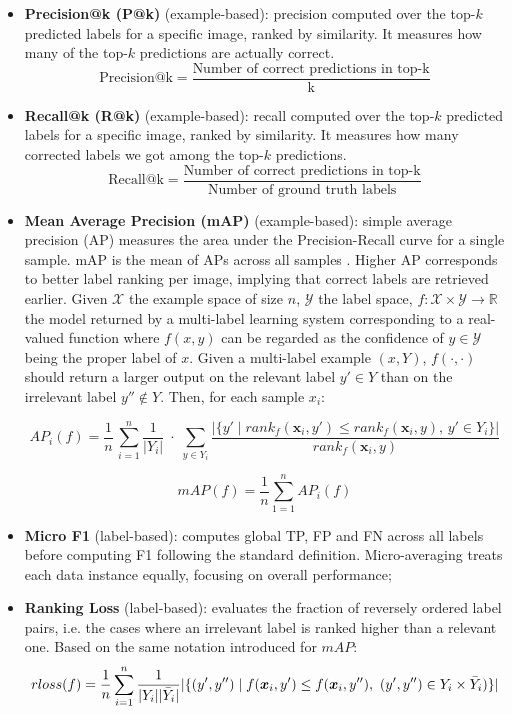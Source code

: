\documentclass[a4paper, twoside, english]{sapthesis} %
\begin{document}
\begin{itemize}
    \item \textbf{Precision@k (P@k)} (example-based): precision computed over the top-$k$ predicted labels for a specific image, ranked by similarity. It measures how many of the top-$k$ predictions are actually correct.
    $$
    \text{Precision@k} = \frac{\text{Number of correct predictions in top-k}}{\text{k}}
    $$
    \item \textbf{Recall@k (R@k)} (example-based): recall computed over the top-$k$ predicted labels for a specific image, ranked by similarity. It measures how many corrected labels we got among the top-$k$ predictions.
    $$
    \text{Recall@k} = \frac{\text{Number of correct predictions in top-k}}{\text{Number of ground truth labels}}
    $$
    \item \textbf{Mean Average Precision (mAP)} (example-based): simple average precision (AP) measures the area under the Precision-Recall curve for a single sample. mAP is the mean of APs across all samples \cite{zhang2013review}. Higher AP corresponds to better label ranking per image, implying that correct labels are retrieved earlier. Given $\mathcal{X}$ the example space of size $n$, $\mathcal{Y}$ the label space, $f:\mathcal{X} \times \mathcal{Y} \to \mathbb{R}$ the model returned by a multi-label learning system corresponding to a real-valued function where $f(x, y)$ can be regarded as the confidence of $y \in \mathcal{Y}$ being the proper label of $x$. Given a multi-label example $(x, Y)$, $f(\cdot, \cdot)$ should return a larger output on the relevant label $y' \in Y$ than on the irrelevant label $y'' \not\in Y$. Then, for each sample $x_i$:

    $$
    AP_i(f)=\frac {1}{n} \,\sum _{i=1}^n \frac {1}{|Y_i|} \;\cdot\;\sum \limits _{y\in Y_i}\frac {|\{y'\mid rank_f({\boldsymbol x}_i,y')\leq rank_f({\boldsymbol x}_i,y),\,y'\in Y_i\}|}{rank_f({\boldsymbol x}_i,y)}
    $$

    $$
    mAP(f) = \frac{1}{n} \sum_{1=1}^n AP_i (f)
    $$
    
    \item \textbf{Micro F1} (label-based): computes global TP, FP and FN across all labels before computing F1  following the standard definition. Micro-averaging treats each data instance equally, focusing on overall performance;
    
    \item \textbf{Ranking Loss} (label-based): evaluates the fraction of reversely ordered label pairs, i.e. the cases where an irrelevant label is ranked higher than a relevant one. Based on the same notation introduced for $mAP$:
    $$
    rloss(f)=\frac {1}{n}\sum _{i=1}^n \frac {1}{|Y_i| |\bar Y_i|}|\{(y',y'')\mid f({\boldsymbol x}_i,y')\\ \leq f({\boldsymbol x}_i,y''),~(y',y'')\in Y_i\times \bar Y_i)\}|
    $$
    

\end{itemize}
\end{document}
